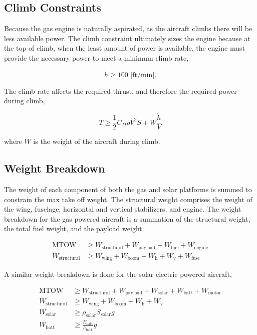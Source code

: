 \documentclass[]{aiaa-tc}%
\begin{document}
\subsection{Climb Constraints}

Because the gas engine is naturally aspirated, as the aircraft climbs there will be less available power.  
The climb constraint ultimately sizes the engine because at the top of climb, when the least amount of power is available, the engine must provide the necessary power to meet a minimum climb rate, 

\begin{equation}
    \label{e:climbrate}
    \dot{h} \geq 100 \text{ [ft/min]}.
\end{equation}

The climb rate affects the required thrust, and therefore the required power during climb, 

\begin{equation}
    \label{e:climb}
    T \geq \frac{1}{2} C_D \rho V^2 S + W \frac{\dot{h}}{V}
\end{equation}

where $W$ is the weight of the aircraft during climb.  

\subsection{Weight Breakdown}

The weight of each component of both the gas and solar platforms is summed to constrain the max take off weight.  
The structural weight comprises the weight of the wing, fuselage, horizontal and vertical stabilizers, and engine. 
The weight breakdown for the gas powered aircraft is a summation of the structural weight, the total fuel weight, and the payload weight. 

\begin{align}
    \label{e:weightmtow}
    \text{MTOW} &\geq W_{\text{structural}}  + W_{\text{payload}} + W_{\text{fuel}} + W_{\text{engine}} \\
    W_{\text{structural}} &\geq W_{\text{wing}} + W_{\text{boom}} + W_{\text{h}}+ W_{\text{v}} + W_{\text{fuse}}
\end{align}

A similar weight breakdown is done for the solar-electric powered aircraft, 

\begin{align}
    \label{e:weightsmtow}
    \text{MTOW} &\geq W_{\text{structural}} + W_{\text{payload}} + W_{\text{solar}} + W_{\text{batt}} + W_{\text{motor}} \\
    W_{\text{structural}} &\geq W_{\text{wing}} + W_{\text{boom}} + W_{\text{h}}+ W_{\text{v}} \\
    W_{\text{solar}} &\geq \rho_{\text{solar}} S_{\text{solar}} g \\
    W_{\text{batt}} &\geq \frac{E_{\text{batt}}}{h_{\text{batt}}} g
\end{align}
\end{document}
